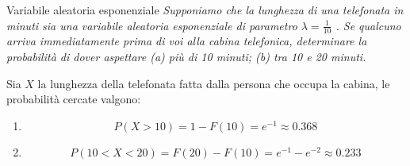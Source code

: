 \begin{Example}{Variabile aleatoria esponenziale}{}
    \textit{Supponiamo che la lunghezza di una telefonata in minuti sia una variabile aleatoria esponenziale di parametro $\lambda=\frac{1}{10}$ . Se qualcuno arriva immediatamente prima di voi alla cabina telefonica, determinare la probabilità di dover aspettare (a) più di 10 minuti; (b) tra 10 e 20 minuti.}

    Sia $X$ la lunghezza della telefonata fatta dalla persona che occupa la cabina, le probabilità cercate valgono:
    \begin{enumerate}[label=(\alph*)]
        \item
        \begin{equation*}
            P(X>10)=1-F(10)=e^{-1}\approx 0.368
        \end{equation*}
        \item
        \begin{equation*}
            P(10<X<20)=F(20)-F(10)=e^{-1}-e^{-2}\approx 0.233
        \end{equation*}
    \end{enumerate}
\end{Example}
